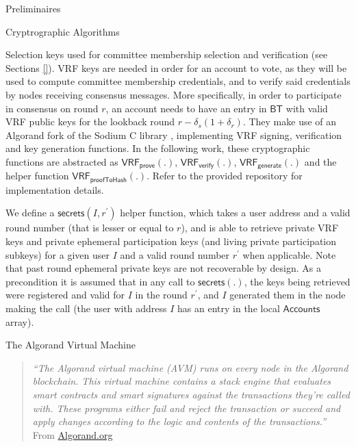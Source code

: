 \documentclass[10pt,a4paper]{article}
\begin{document}
\begin{section}{Preliminaires}
\begin{subsection}{Cryptrographic Algorithms}

Selection keys used for committee membership selection and verification (see Sections \ref{}).
VRF keys are needed in order for an account to vote, as they will be
used to compute committee membership credentials, and to verify said credentials by nodes receiving consensus messages.
More specifically, in order to participate in consensus on round $r$, an account needs to have an entry in $\mathsf{BT}$
with valid VRF public keys for the lookback round $r-\delta_s(1+\delta_r)$.
They make use of an Algorand fork of the Sodium C library , implementing VRF signing, verification and
key generation functions.
    In the following work, these cryptographic functions are abstracted as $\mathsf{VRF_{prove}}(.)$, $\mathsf{VRF_{verify}}(.)$, $\mathsf{VRF_{generate}}(.)$
    and the helper function $\mathsf{VRF_{proofToHash}}(.)$.
    Refer to the provided repository for implementation details.


    We define a $\mathsf{secrets}(I, r^\prime)$ helper function, which takes a user address and
    a valid round number (that is lesser or equal to $r$), and is able to retrieve private VRF keys
    and private ephemeral participation keys (and living private participation subkeys) for a given user $I$ 
    and a valid round number $r^\prime$ when applicable. Note that past round ephemeral private keys are not recoverable
    by design. 
    As a precondition it is assumed that in any call to $\mathsf{secrets(.)}$,
    the keys being retrieved were registered and valid for $I$ in the round $r^\prime$, and $I$ generated them
    in the node making the call (the user with address $I$ has an entry in the local $\mathsf{Accounts}$ array).

\end{subsection}
\begin{subsection}{The Algorand Virtual Machine}\label{sect:avm}
    
    \begin{quote} 
        {\em``The Algorand virtual machine (AVM) runs on every node in the Algorand blockchain. 
    This virtual machine contains a stack engine that evaluates smart contracts and smart 
    signatures against the transactions they're called with. These programs either fail 
    and reject the transaction or succeed and apply changes according to the logic and 
    contents of the transactions.''} From \href{https://developer.algorand.org/docs/get-details/dapps/avm/}{Algorand.org}
    \end{quote}
    

\end{subsection}
\end{section}
\end{document}
